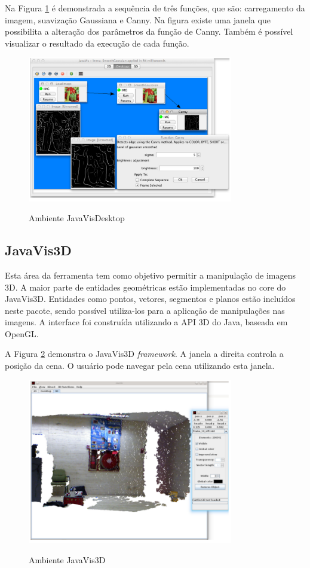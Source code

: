 \documentclass[
	12pt,				%
	oneside,			%
	a4paper,			%
	english,			%
	french,				%
	spanish,			%
	brazil,				%
	]{abntex2}
\begin{document}
Na Figura \ref{fig:javavis_desktop} é demonstrada a sequência de três funções, que são: carregamento da imagem, suavização Gaussiana e Canny. Na figura existe uma janela que possibilita a alteração dos parâmetros da função de Canny. Também é possível visualizar o resultado da execução de cada função.

\begin{figure}[ht]
\centering
\caption{Ambiente JavaVisDesktop}
\includegraphics[width=0.8\textwidth]{imagens/javavis_desktop.png}
\label{fig:javavis_desktop}
\end{figure}

\subsection{JavaVis3D}

Esta área da ferramenta tem como objetivo permitir a manipulação de imagens 3D. A maior parte de entidades geométricas estão implementadas no core do JavaVis3D. Entidades como pontos, vetores, segmentos e planos estão incluídos neste pacote, sendo possível utiliza-los para a aplicação de manipulações nas imagens. A interface foi construída utilizando a API 3D do Java, baseada em OpenGL.

A Figura \ref{fig:javavis_3d} demonstra o JavaVis3D \textit{framework}. A janela a direita controla a posição da cena. O usuário pode navegar pela cena utilizando esta janela.

\begin{figure}[ht]
\centering
\caption{Ambiente JavaVis3D}
\includegraphics[width=0.8\textwidth]{imagens/javavis_3d.png}
\label{fig:javavis_3d}
\end{figure}
\end{document}
